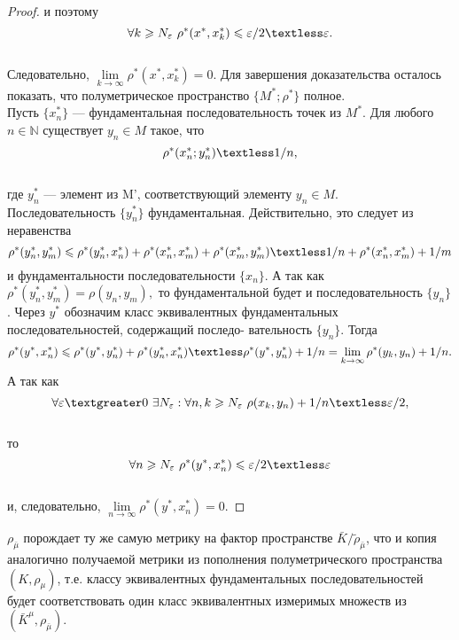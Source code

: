 \begin{proof}
и поэтому
$$\forall k \geq N_\epsilon  \  \rho^*(x^*,x^*_k) \leq \epsilon /2 \textless \epsilon.$$\\
Следовательно, $\lim\limits_{k\to \infty} \rho^*(x^*,x^*_k) = 0.$
Для завершения доказательства осталось показать, что полуметрическое пространство $\{M^*;\rho^* \}$ полное.\\
Пусть $\{x^*_n\}$ — фундаментальная последовательность точек из $M^*.$ Для любого $n \in \mathds{N}$ существует $y_n \in M$ такое, что\\
$$\rho^*( x^*_n ; y^*_n ) \textless 1/n ,$$\\
где $y^*_n$ — элемент из M', соответствующий элементу $y_n \in M.$\\
Последовательность $\{y^*_n\}$ фундаментальная. Действительно, это следует из неравенства\\
$$ \rho^*(y^*_n,y^*_m ) \leq \rho^*(y^*_n,x^*_n ) + \rho^*(x^*_n,x^*_m ) + \rho^*(x^*_m,y^*_m ) \textless 1/n + \rho^*(x^*_n,x^*_m ) + 1/m$$
и фундаментальности последовательности $\{x_n\}$. А так как $\rho^*(y^*_n,y^*_m ) = \rho(y_n,y_m),$ то фундаментальной будет и последовательность $\{y_n\}$. Через $y^*$ обозначим класс эквивалентных фундаментальных последовательностей, содержащий последо- вательность $\{y_n\}$. Тогда
$$\rho^*(y^*,x^*_n ) \leq \rho^*(y^*,y^*_n ) + \rho^*(y^*_n,x^*_n ) \textless \rho^*(y^*,y^*_n ) + 1/n = \lim\limits_{k\to \infty} \rho^*(y_k,y_n) + 1/n .$$
А так как\\
$$\forall \epsilon \textgreater 0 \   \exists N_\epsilon: \forall n,k\geq N_\epsilon \   \rho(x_k,y_n) + 1/n \textless \epsilon/2,$$\\
то
$$\forall n\geq N_\epsilon \   \rho^*(y^*,x^*_n) \leq \epsilon/2 \textless \epsilon$$\\
и, следовательно, $\lim\limits_{n\to \infty} \rho^*(y^*,x^*_n) = 0.$
\end{proof}

\begin{remark}[Лекция 8] $\rho_{\bar{\mu}}$ порождает ту же самую метрику на фактор пространстве $\bar{K}/\tilde{\rho}_{\bar{\mu}}$, что и копия аналогично получаемой метрики из пополнения полуметрического пространства $(K, \rho_{\mu})$, т.е. классу эквивалентных фундаментальных последовательностей будет соответствовать один класс эквивалентных измеримых множеств из $(\bar{K}^{\mu}, \rho_{\bar{\mu}})$.
	\end{remark}
